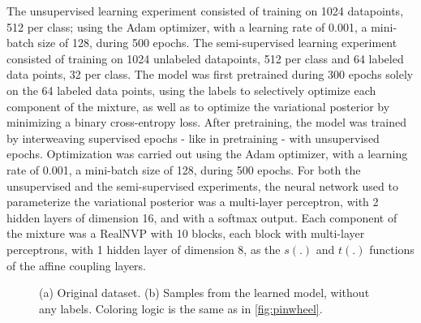 The unsupervised learning experiment consisted of training on 1024 datapoints,
512 per class; using the Adam optimizer, with a learning rate
of 0.001, a mini-batch size of 128, during 500 epochs.
The semi-supervised learning experiment consisted of training on 1024 unlabeled
datapoints, 512 per class and 64 labeled data points, 32 per class. The model
was first pretrained during 300 epochs solely on the 64 labeled data points, using
the labels to selectively optimize each component of the mixture, as well as
to optimize the variational posterior by minimizing a binary cross-entropy loss.
After pretraining, the model was trained by interweaving supervised epochs - like
in pretraining - with unsupervised epochs. Optimization was carried out using the
Adam optimizer, with a learning rate of 0.001, a mini-batch size of 128, during 500 epochs.
For both the unsupervised and the semi-supervised experiments, the neural network
used to parameterize the variational posterior was a multi-layer perceptron, with
2 hidden layers of dimension 16, and with a softmax output. Each component of the
mixture was a RealNVP with 10 blocks, each block with multi-layer perceptrons,
with 1 hidden layer of dimension 8, as the $s(.)$ and $t(.)$ functions of the
affine coupling layers.

\begin{figure}[!htb]
  \begin{subfigmatrix}{2}
  \end{subfigmatrix}
    \caption{(a) Original dataset. (b) Samples from the learned model, without
    any labels. Coloring logic is the same as in \ref{fig:pinwheel}.}
\label{fig:twocircles}
\end{figure}

